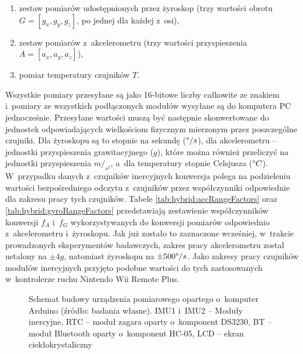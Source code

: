 \begin{enumerate}
	\item zestaw pomiarów udostępnionych przez żyroskop (trzy wartości obrotu $G = [g_x, g_y, g_z]$, po jednej dla każdej z~osi),
	\item zestaw pomiarów z~akcelerometru (trzy wartości przyspieszenia $A = [a_x, a_y, a_z]$),
	\item pomiar temperatury czujników $T$.
\end{enumerate}

Wszystkie pomiary przesyłane są jako 16-bitowe liczby całkowite ze znakiem i~pomiary ze wszystkich podłączonych modułów wysyłane są do komputera PC jednocześnie. Przesyłane wartości muszą być następnie skonwertowane do jednostek odpowiadających wielkościom fizycznym mierzonym przez poszczególne czujniki. Dla żyroskopu są to stopnie na sekundę ($\degree/s$), dla akcelerometru -- jednostki przyspieszenia grawitacyjnego ($g$), które można również przeliczyć na jednostki przyspieszenia $m/_{s^2}$, a~dla temperatury stopnie Celsjusza ($\degree C$). W~przypadku danych z~czujników inercyjnych konwersja polega na podzieleniu wartości bezpośredniego odczytu z~czujników przez współczynniki odpowiednie dla zakresu pracy tych czujników. Tabele \ref{tab:hybrid:accRangeFactors} oraz \ref{tab:hybrid:gyroRangeFactors} przedstawiają zestawienie współczynników konwersji $f_A$ i~$f_G$ wykorzystywanych do konwersji pomiarów odpowiednio z~akcelerometru i~żyroskopu. Jak już zostało to zaznaczone wcześniej, w~trakcie prowadzonych eksperymentów badawczych, zakres pracy akcelerometru został ustalony na $\pm4g$, natomiast żyroskopu na $\pm500\degree/s$. Jako zakresy pracy czujników modułów inercyjnych przyjęto podobne wartości do tych zastosowanych w~kontrolerze ruchu Nintendo Wii Remote Plus. 
	
\begin{figure}[!htb]
		\captionsetup{singlelinecheck=off}
	\centering
	\caption{Schemat budowy urządzenia pomiarowego opartego o~komputer Arduino (źródło: badania własne). IMU1 i~IMU2 -- Moduły inercyjne, RTC -- moduł zagara oparty o~komponent DS3230, BT -- moduł Bluetooth oparty o~komponent HC-05, LCD -- ekran ciekłokrystaliczny}	
	\label{fig:device:circuitDiagram}
\end{figure}
		
